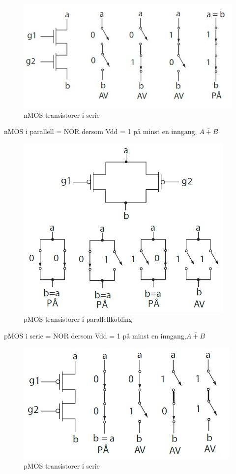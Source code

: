 \documentclass{article}
\begin{document}
	\begin{figure}[H]
		\includegraphics[scale = 0.6]{nMOSserie.jpg}
		\caption{nMOS transistorer i serie}
	\end{figure}
	
	nMOS i parallell = NOR dersom Vdd = 1 på minst en inngang, $\overline{A+B}$
	
	\begin{figure}[H]
		\includegraphics[scale = 0.6]{pMOSpara.jpg}
		\caption{pMOS transistorer i parallellkobling}
	\end{figure}
	
	pMOS i serie = NOR dersom Vdd = 1 på minst en inngang,$\overline{A+B}$
	
	\begin{figure}[H]
		\includegraphics[scale = 0.6]{pMOSserie.jpg}
		\caption{pMOS transistorer i serie}
	\end{figure}
	
\end{document}
